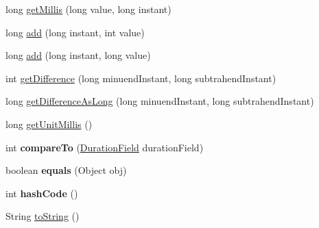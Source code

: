 \begin{DoxyCompactItemize}
\item 
long \hyperlink{classorg_1_1joda_1_1time_1_1field_1_1_delegated_duration_field_abf5351576f9f6ecb5e5bc85c4e576328}{get\-Millis} (long value, long instant)
\item 
long \hyperlink{classorg_1_1joda_1_1time_1_1field_1_1_delegated_duration_field_adb1ff32bf99383594f23745b40ff9d22}{add} (long instant, int value)
\item 
long \hyperlink{classorg_1_1joda_1_1time_1_1field_1_1_delegated_duration_field_af662c7d3f85871bfbb250153e0582356}{add} (long instant, long value)
\item 
int \hyperlink{classorg_1_1joda_1_1time_1_1field_1_1_delegated_duration_field_a602022c1b7920eb6b978635795a63c2b}{get\-Difference} (long minuend\-Instant, long subtrahend\-Instant)
\item 
long \hyperlink{classorg_1_1joda_1_1time_1_1field_1_1_delegated_duration_field_a41266d88dc358c5aa571162dfa93cde4}{get\-Difference\-As\-Long} (long minuend\-Instant, long subtrahend\-Instant)
\item 
long \hyperlink{classorg_1_1joda_1_1time_1_1field_1_1_delegated_duration_field_aef1ff941f73bc7cce103460fb66a08b0}{get\-Unit\-Millis} ()
\item 
\hypertarget{classorg_1_1joda_1_1time_1_1field_1_1_delegated_duration_field_a79ea5dbce0be2e81b271445091abb95d}{int {\bfseries compare\-To} (\hyperlink{classorg_1_1joda_1_1time_1_1_duration_field}{Duration\-Field} duration\-Field)}\label{classorg_1_1joda_1_1time_1_1field_1_1_delegated_duration_field_a79ea5dbce0be2e81b271445091abb95d}

\item 
\hypertarget{classorg_1_1joda_1_1time_1_1field_1_1_delegated_duration_field_a4d61d0a6b287ee17f3a1157f0735c548}{boolean {\bfseries equals} (Object obj)}\label{classorg_1_1joda_1_1time_1_1field_1_1_delegated_duration_field_a4d61d0a6b287ee17f3a1157f0735c548}

\item 
\hypertarget{classorg_1_1joda_1_1time_1_1field_1_1_delegated_duration_field_a0d35150a31df570f743d84140a6c915f}{int {\bfseries hash\-Code} ()}\label{classorg_1_1joda_1_1time_1_1field_1_1_delegated_duration_field_a0d35150a31df570f743d84140a6c915f}

\item 
String \hyperlink{classorg_1_1joda_1_1time_1_1field_1_1_delegated_duration_field_a76e10d760e585e116a9444a8bee92dd1}{to\-String} ()
\end{DoxyCompactItemize}

